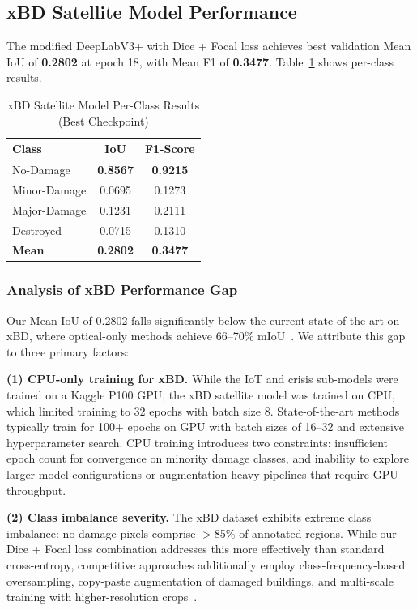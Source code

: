 \documentclass[journal]{IEEEtran}
\begin{document}
\subsection{xBD Satellite Model Performance}

The modified DeepLabV3+ with Dice + Focal loss achieves best validation Mean IoU of \textbf{0.2802} at epoch 18, with Mean F1 of \textbf{0.3477}. Table~\ref{tab:xbd_results} shows per-class results.

\begin{table}[!t]
\centering
\caption{xBD Satellite Model Per-Class Results (Best Checkpoint)}
\label{tab:xbd_results}
\begin{tabular}{lcc}
\toprule
\textbf{Class} & \textbf{IoU} & \textbf{F1-Score} \\
\midrule
No-Damage & \textbf{0.8567} & \textbf{0.9215} \\
Minor-Damage & 0.0695 & 0.1273 \\
Major-Damage & 0.1231 & 0.2111 \\
Destroyed & 0.0715 & 0.1310 \\
\midrule
\textbf{Mean} & \textbf{0.2802} & \textbf{0.3477} \\
\bottomrule
\end{tabular}
\end{table}

\subsubsection{Analysis of xBD Performance Gap}

Our Mean IoU of 0.2802 falls significantly below the current state of the art on xBD, where optical-only methods achieve 66--70\% mIoU~\cite{benson2025xbdsota}. We attribute this gap to three primary factors:

\textbf{(1) CPU-only training for xBD.} While the IoT and crisis sub-models were trained on a Kaggle P100 GPU, the xBD satellite model was trained on CPU, which limited training to 32 epochs with batch size 8. State-of-the-art methods typically train for 100+ epochs on GPU with batch sizes of 16--32 and extensive hyperparameter search. CPU training introduces two constraints: insufficient epoch count for convergence on minority damage classes, and inability to explore larger model configurations or augmentation-heavy pipelines that require GPU throughput.

\textbf{(2) Class imbalance severity.} The xBD dataset exhibits extreme class imbalance: no-damage pixels comprise $>$85\% of annotated regions. While our Dice + Focal loss combination addresses this more effectively than standard cross-entropy, competitive approaches additionally employ class-frequency-based oversampling, copy-paste augmentation of damaged buildings, and multi-scale training with higher-resolution crops~\cite{benson2025xbdsota}.
\end{document}
